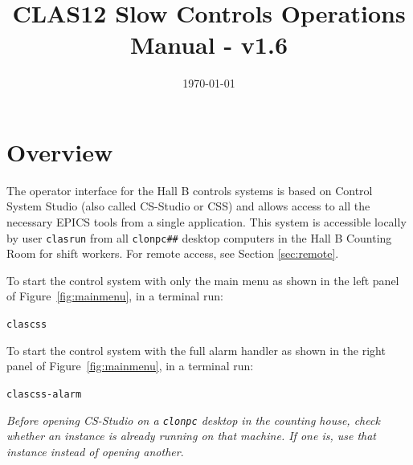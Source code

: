 \documentclass[amsmath,amssymb,notitlepage,11pt]{revtex4}
\begin{document}
\title{CLAS12 Slow Controls Operations Manual - v1.6}
\date{\today}
\begin{abstract}
\end{abstract}

\maketitle

\section{Overview}
The operator interface for the Hall B controls systems is based on Control System Studio (also called CS-Studio or CSS) and allows access to all the necessary EPICS tools from a single application.  This system is accessible locally by user \texttt{clasrun} from all \texttt{clonpc\#\#} desktop computers in the Hall B Counting Room for shift workers.  For remote access, see Section \ref{sec:remote}.

To start the control system with only the main menu as shown in the left panel of Figure~\ref{fig:mainmenu}, in a terminal run: \begin{center}\texttt{clascss}\end{center}
To start the control system with the full alarm handler as shown in the right panel of Figure~\ref{fig:mainmenu}, in a terminal run:
\begin{center}\texttt{clascss-alarm}\end{center}
{\em Before opening CS-Studio on a \texttt{clonpc} desktop in the counting house, check whether an instance is already running on that machine.  If one is, use that instance instead of opening another}.  
\end{document}

